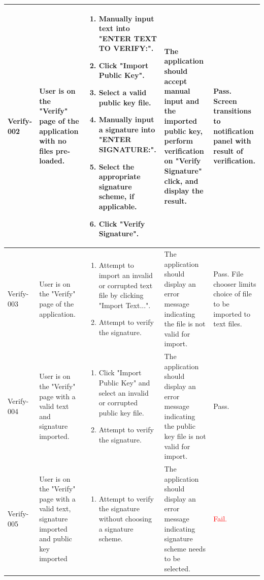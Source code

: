 \documentclass[]{final_report}
\theoremstyle{definition}
\begin{document}
\begin{longtable}{|p{1.2cm}|p{3cm}|p{3cm}|p{4cm}|p{4cm}|}
   Verify-002 & User is on the "Verify" page of the application with no files pre-loaded. & 
  \begin{enumerate}
    \item Manually input text into "ENTER TEXT TO VERIFY:".
    \item Click "Import Public Key".
    \item Select a valid public key file.
    \item Manually input a signature into "ENTER SIGNATURE:".
    \item Select the appropriate signature scheme, if applicable.
    \item Click "Verify Signature".
  \end{enumerate}
  & The application should accept manual input and the imported public key, perform verification on "Verify Signature" click, and display the result. & Pass. Screen transitions to notification panel with result of verification. \\
  \hline
  Verify-003 & User is on the "Verify" page of the application. & 
  \begin{enumerate}
    \item Attempt to import an invalid or corrupted text file by clicking "Import Text...".
    \item Attempt to verify the signature.
  \end{enumerate}
  & The application should display an error message indicating the file is not valid for import. & Pass. File chooser limits choice of file to be imported to text files. \\
  \hline
  Verify-004 & User is on the "Verify" page with a valid text and signature imported. & 
  \begin{enumerate}
    \item Click "Import Public Key" and select an invalid or corrupted public key file.
    \item Attempt to verify the signature.
  \end{enumerate}
  & The application should display an error message indicating the public key file is not valid for import. & Pass. \\
      \hline
    Verify-005 & User is on the "Verify" page with a valid text, signature imported and public key imported & 
  \begin{enumerate}
    \item Attempt to verify the signature without choosing a signature scheme.
  \end{enumerate}
  & The application should display an error message indicating signature scheme needs to be selected. & \textcolor{red}{Fail.} \\

\end{longtable}
\end{document}
